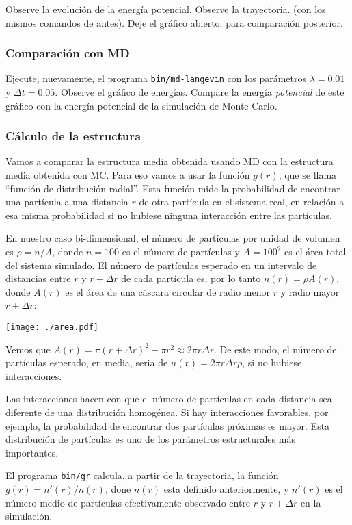 Observe la evolución de la energía potencial. Observe la trayectoria. 
(con los mismos comandos de antes). Deje el gráfico abierto, para
comparación posterior. 

\subsubsection{Comparación con MD}

Ejecute, nuevamente, el programa {\tt bin/md-langevin} con los
parámetros $\lambda=0.01$ y $\Delta t=0.05$. Observe el gráfico
de energías. Compare la energía {\it potencial} de este gráfico con la
energía potencial de la simulación de Monte-Carlo.

\subsubsection{Cálculo de la estructura}

Vamos a comparar la estructura media obtenida usando MD con la
estructura media obtenida con MC. Para eso vamos a usar la función
$g(r)$, que se llama ``función de distribución radial''. 
Esta función mide la probabilidad de encontrar una partícula a
una distancia $r$ de otra partícula en el sistema real, en relación a
esa misma probabilidad si no hubiese ninguna interacción entre las
partículas. 

En nuestro caso bi-dimensional, el número de partículas por unidad de
volumen es $\rho=n/A$, donde $n=100$ es el número de partículas y $A=100^2$
es el área total del sistema simulado. El número de partículas esperado
en un intervalo de distancias entre $r$ y $r+\Delta r$ de cada partícula
es, por lo tanto $n(r)=\rho A(r)$, donde $A(r)$ es el área de una cáscara
circular de radio menor $r$ y radio mayor $r+\Delta r$:
\begin{center}
\texttt{[image: ./area.pdf]}
\end{center}
Vemos que $A(r)=\pi (r+\Delta r)^2 - \pi r^2 \approx 2\pi r\Delta r$.
De este modo, el número de partículas esperado, en media, seria de 
$n(r)=2\pi r\Delta r\rho$, si no hubiese interacciones. 

Las interacciones hacen con que el número de partículas en cada
distancia sea diferente de una distribución homogénea. Si hay
interacciones favorables, por ejemplo, la probabilidad de encontrar dos
partículas próximas es mayor. Esta distribución de partículas es uno de
los parámetros estructurales más importantes.

El programa {\tt bin/gr} calcula, a partir de la trayectoria, la función
$g(r)=n'(r)/n(r)$, done $n(r)$ esta definido anteriormente, y $n'(r)$ es
el número medio de partículas efectivamente observado entre $r$ y $r+\Delta r$
en la simulación. 

